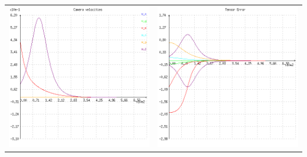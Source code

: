 {\begin{center}
\begin{tabular}{cc}
  \includegraphics[height=0.1\textheight]{figures/plots/ex4cvelocity.png}&
  \includegraphics[height=0.1\textheight]{figures/plots/ex4cerror.png}\\

\end{tabular}
\end{center}}
